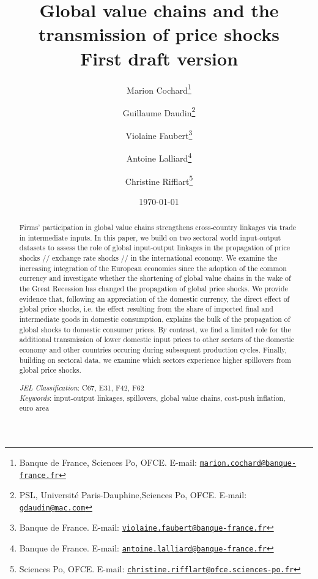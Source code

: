 \documentclass[11pt,a4paper]{article}
\newcommand{\email}[1]{\href{mailto:#1}{\nolinkurl{#1}}}
\begin{document}
\title{Global value chains and the transmission of price shocks\\
\vspace{1cm}
\normalsize{First draft version}
}
\vspace{1cm}
\date{\today}
\author{Marion Cochard\thanks{Banque de France, Sciences Po, OFCE. E-mail: \email{marion.cochard@banque-france.fr}}\and Guillaume Daudin\thanks{PSL, Universit\'e Paris-Dauphine,Sciences Po, OFCE. E-mail: \email{gdaudin@mac.com}}\and Violaine Faubert\thanks{Banque de France. E-mail: \email{violaine.faubert@banque-france.fr}} \and Antoine Lalliard\thanks{Banque de France. E-mail: \email{antoine.lalliard@banque-france.fr}} \and Christine Rifflart\thanks{Sciences Po, OFCE. E-mail: \email{christine.rifflart@ofce.sciences-po.fr}}
}
\maketitle
\begin{abstract}
{\small \noindent
Firms' participation in global value chains strengthens cross-country linkages via trade in intermediate inputs. 
In this paper, we build on two sectoral world input-output datasets  to assess the role of global input-output linkages in the propagation of price shocks // exchange rate shocks // in the international economy. 
We examine the increasing integration of the European economies since the adoption of the common currency and investigate whether the shortening of global value chains in the wake of the Great Recession has changed the propagation of global price shocks. We provide evidence that, following an appreciation of the domestic currency, the direct effect of global price shocks, i.e. the effect resulting from the share of imported final and intermediate goods in domestic consumption, explains the bulk of the propagation of global shocks to domestic consumer prices. By contrast, we find a limited role for the additional transmission of lower domestic input prices to other sectors of the domestic economy and other countries occuring during subsequent production cycles. Finally, building on sectoral data, we examine which sectors experience higher spillovers from global price shocks.
}

{\small \bigskip \noindent \emph{JEL Classification}\/: C67, E31, F42, F62\\}
{\small \noindent \emph{Keywords}\/: input-output linkages, spillovers, global value chains, cost-push inflation, euro area \\ }
\end{abstract}
\end{document}
